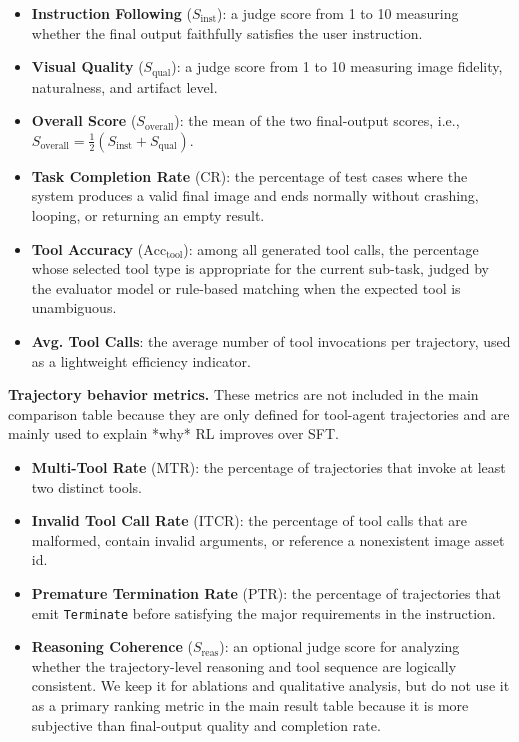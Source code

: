 \documentclass[11pt]{article}
\begin{document}
\begin{itemize}
    \item \textbf{Instruction Following} ($S_{\text{inst}}$): a judge score from 1 to 10 measuring whether the final output faithfully satisfies the user instruction.
    \item \textbf{Visual Quality} ($S_{\text{qual}}$): a judge score from 1 to 10 measuring image fidelity, naturalness, and artifact level.
    \item \textbf{Overall Score} ($S_{\text{overall}}$): the mean of the two final-output scores, i.e., $S_{\text{overall}} = \frac{1}{2}(S_{\text{inst}} + S_{\text{qual}})$.
    \item \textbf{Task Completion Rate} ($\text{CR}$): the percentage of test cases where the system produces a valid final image and ends normally without crashing, looping, or returning an empty result.
    \item \textbf{Tool Accuracy} ($\text{Acc}_{\text{tool}}$): among all generated tool calls, the percentage whose selected tool type is appropriate for the current sub-task, judged by the evaluator model or rule-based matching when the expected tool is unambiguous.
    \item \textbf{Avg. Tool Calls}: the average number of tool invocations per trajectory, used as a lightweight efficiency indicator.
\end{itemize}

\textbf{Trajectory behavior metrics.} These metrics are not included in the main comparison table because they are only defined for tool-agent trajectories and are mainly used to explain *why* RL improves over SFT.

\begin{itemize}
    \item \textbf{Multi-Tool Rate} ($\text{MTR}$): the percentage of trajectories that invoke at least two distinct tools.
    \item \textbf{Invalid Tool Call Rate} ($\text{ITCR}$): the percentage of tool calls that are malformed, contain invalid arguments, or reference a nonexistent image asset id.
    \item \textbf{Premature Termination Rate} ($\text{PTR}$): the percentage of trajectories that emit \texttt{Terminate} before satisfying the major requirements in the instruction.
    \item \textbf{Reasoning Coherence} ($S_{\text{reas}}$): an optional judge score for analyzing whether the trajectory-level reasoning and tool sequence are logically consistent. We keep it for ablations and qualitative analysis, but do not use it as a primary ranking metric in the main result table because it is more subjective than final-output quality and completion rate.
\end{itemize}
\end{document}

